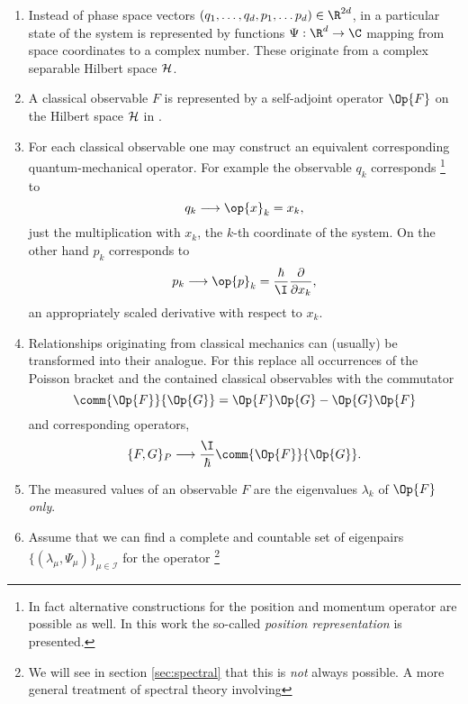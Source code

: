 \begin{enumerate}[label=(\alph*)]
	\item Instead of phase space vectors $\clphase \in \R^{2d}$,
		in \QM a particular state of the system is represented
		by functions $\Psi : \R^d \to \C$
		mapping from space coordinates to a complex number.
		These originate from a complex separable Hilbert space $\mathcal{H}$.
	\item A classical observable $F$ is represented by a
		self-adjoint operator $\Op{F}$ on the Hilbert space $\mathcal{H}$ in \QM.
	\item For each classical observable one may construct an equivalent
		corresponding \linebreak
		quantum-mechanical operator.
		For example the observable $q_k$ corresponds%
		\footnote{In fact alternative constructions for the position and momentum
				operator are possible as well. In this work the so-called
				\textit{position representation} is presented.}
		to~\cite{Shankar1994, Mueller2000}
		\[ q_k \longrightarrow \op{x}_k = x_k, \]
		\ie just the multiplication with $x_k$,
		the $k$-th coordinate of the system.
		On the other hand $p_k$ corresponds to~\cite{Shankar1994, Mueller2000}
		\[ p_k \longrightarrow \op{p}_k
			= \frac{\hbar}{\I} \frac{\partial}{\partial x_k}, \]
		an appropriately scaled derivative with respect to $x_k$.
	\item Relationships originating from classical mechanics
		can (usually) be transformed into their \QM analogue.
		For this replace all occurrences of the Poisson bracket
		and the contained classical observables with the commutator
		\begin{equation}
			\comm{\Op{F}}{\Op{G}} = \Op{F} \Op{G} - \Op{G} \Op{F}
			\label{eqn:Operator}
		\end{equation}
		and corresponding operators, \ie~\cite{Shankar1994}
		\[ \{F, G\}_P \longrightarrow \frac{\I}{\hbar} \comm{\Op{F}}{\Op{G}}. \]
	\item The measured values of an observable $F$
		are the eigenvalues $\lambda_k$ of $\Op{F}$ \emph{only}.
	\item Assume that we can find a complete and countable
		set of eigenpairs $\{ (\lambda_\mu, \Psi_\mu) \}_{\mu \in \mathcal{I}}$
		for the operator%
		\footnote{We will see in section \vref{sec:spectral}
		that this is \emph{not} always possible.
		A more general treatment of spectral theory involving
}
\end{enumerate}
